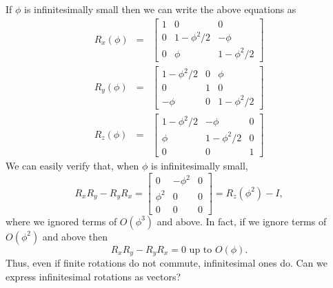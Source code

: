 \documentclass{article}
\numberwithin{equation}{section}
\theoremstyle{plain}
\numberwithin{thm}{section}
\theoremstyle{plain}
\numberwithin{prop}{section}
\theoremstyle{definition}
\numberwithin{defn}{section}
\theoremstyle{remark}
\begin{document}
If $\phi$ is infinitesimally small then we can write the above equations as
\begin{eqnarray}
R_x(\phi) &=& \begin{bmatrix}1 & 0 & 0 \\
0 & 1 - \phi^2/2 & -\phi \\
0 & \phi & 1 - \phi^2/2
\end{bmatrix} \label{s2e5} \\
R_y(\phi) &=& \begin{bmatrix}1 - \phi^2/2 & 0 & \phi \\
0 & 1 & 0 \\
-\phi & 0 & 1 - \phi^2/2
\end{bmatrix} \label{s2e6} \\
R_z(\phi) &=& \begin{bmatrix}1 - \phi^2/2 & -\phi & 0 \\
\phi & 1 - \phi^2/2 & 0 \\
0 & 0 & 1
\end{bmatrix} \label{s2e7}
\end{eqnarray}
We can easily verify that, when $\phi$ is infinitesimally small,
\begin{equation}\label{s2e8}
R_xR_y - R_yR_x = \begin{bmatrix}0 & -\phi^2 & 0 \\
\phi^2 & 0 & 0 \\
0 & 0 & 0 \end{bmatrix} = R_z(\phi^2) - I,
\end{equation}
where we ignored terms of $O(\phi^3)$ and above. In fact, if we ignore terms
of $O(\phi^2)$ and above then 
\begin{equation}\label{s2e9}
R_xR_y - R_yR_x = 0 \text{ up to } O(\phi).
\end{equation}
Thus, even if finite rotations do not commute, infinitesimal ones do. Can we 
express infinitesimal rotations as vectors?
\end{document}
